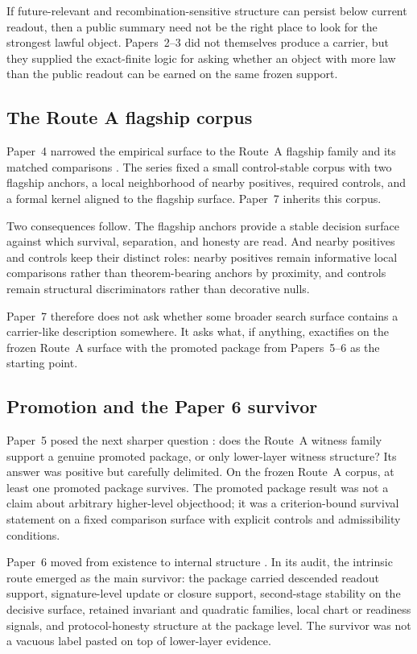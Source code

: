 \documentclass[11pt]{article}
\theoremstyle{definition}
\begin{document}
If future-relevant and recombination-sensitive structure can persist below current
readout, then a public summary need not be the right place to look for the strongest
lawful object. Papers~2--3 did not themselves produce a carrier, but they supplied the
exact-finite logic for asking whether an object with more law than the public readout
can be earned on the same frozen support.

\subsection{The Route A flagship corpus}

Paper~4 narrowed the empirical surface to the Route~A flagship family and its matched
comparisons \citep{Tsiokos2026RecombinationWitnesses}. The series fixed a small
control-stable corpus with two flagship anchors, a local neighborhood of nearby
positives, required controls, and a formal kernel aligned to the flagship surface.
Paper~7 inherits this corpus.

Two consequences follow. The flagship anchors provide a stable decision surface against
which survival, separation, and honesty are read. And nearby positives and controls
keep their distinct roles: nearby positives remain informative local comparisons rather
than theorem-bearing anchors by proximity, and controls remain structural discriminators
rather than decorative nulls.

Paper~7 therefore does not ask whether some broader search surface contains a
carrier-like description somewhere. It asks what, if anything, exactifies on the frozen
Route~A surface with the promoted package from Papers~5--6 as the starting point.

\subsection{Promotion and the Paper 6 survivor}

Paper~5 posed the next sharper question \citep{Tsiokos2026PromotionCriteria}: does the
Route~A witness family support a genuine promoted package, or only lower-layer witness
structure? Its answer was positive but carefully delimited.
On the frozen Route~A corpus, at least one promoted package survives. The promoted
package result was not a claim about arbitrary higher-level objecthood; it was a
criterion-bound survival statement on a fixed comparison surface with explicit controls
and admissibility conditions.

Paper~6 moved from existence to internal structure
\citep{Tsiokos2026InternalStructure}. In its audit, the intrinsic route emerged as the
main survivor: the package carried descended readout support, signature-level update or
closure support, second-stage stability on the decisive surface, retained invariant and
quadratic families, local chart or readiness signals, and protocol-honesty structure at
the package level. The survivor was not a vacuous label pasted on top of lower-layer
evidence.
\end{document}
